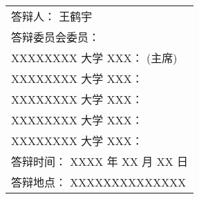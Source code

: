 \begin{titlepage}
\begin{center}
		\vspace{6cm}
		{\sanhao
			\begin{center} \renewcommand{\arraystretch}{1.5}
				\begin{tabular}{l}
					答辩人： 王鹤宇 \\
					答辩委员会委员：\\
					\hspace{2em} XXXXXXXX 大学 XXX： \underline{\hspace{6em}} (主席) \\
					\hspace{2em} XXXXXXXX 大学 XXX： \underline{\hspace{6em}} \\ 
					\hspace{2em} XXXXXXXX 大学 XXX： \underline{\hspace{6em}} \\
					\hspace{2em} XXXXXXXX 大学 XXX： \underline{\hspace{6em}} \\
					\hspace{2em} XXXXXXXX 大学 XXX： \underline{\hspace{6em}} \\
					答辩时间： XXXX 年 XX 月 XX 日 \\
					答辩地点： XXXXXXXXXXXXXX \\
				\end{tabular} \renewcommand{\arraystretch}{1}
			\end{center} 
		}
	\end{center}
	\clearpage{\pagestyle{empty}\cleardoublepage}
\end{titlepage}
